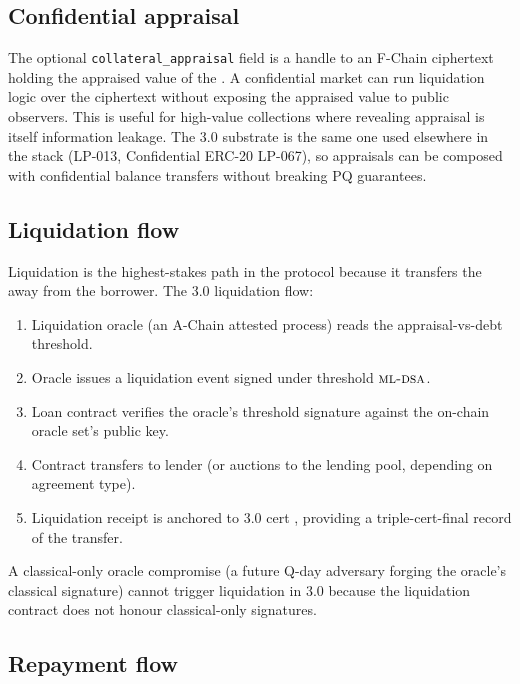 \subsection{Confidential appraisal}

The optional \texttt{collateral\_appraisal} field is a handle to an
F-Chain \FHE{} ciphertext holding the appraised value of the \NFT{}.
A confidential market can run liquidation logic over the ciphertext
without exposing the appraised value to public observers. This is
useful for high-value collections where revealing appraisal is itself
information leakage. The 3.0 \FHE{} substrate is the same one used
elsewhere in the stack (LP-013, Confidential ERC-20 LP-067), so
appraisals can be composed with confidential balance transfers
without breaking PQ guarantees.

\subsection{Liquidation flow}

Liquidation is the highest-stakes path in the protocol because it
transfers the \NFT{} away from the borrower. The 3.0 liquidation
flow:

\begin{enumerate}[leftmargin=1.4em]
  \item Liquidation oracle (an A-Chain attested process) reads the
        appraisal-vs-debt threshold.
  \item Oracle issues a liquidation event signed under threshold
        $\textsc{ml-dsa}{}$.
  \item Loan contract verifies the oracle's threshold signature
        against the on-chain oracle set's public key.
  \item Contract transfers \NFT{} to lender (or auctions to the
        lending pool, depending on agreement type).
  \item Liquidation receipt is anchored to \Lux{} \Quasar{} 3.0 cert
        \cite{lp-020}, providing a triple-cert-final record of the
        transfer.
\end{enumerate}

A classical-only oracle compromise (a future Q-day adversary forging
the oracle's classical signature) cannot trigger liquidation in 3.0
because the liquidation contract does not honour classical-only
signatures.

\subsection{Repayment flow}

